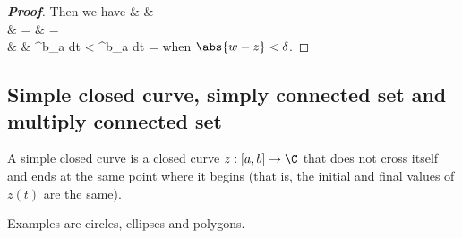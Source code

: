 \begin{proof}[\bf Proof]
Then we have
\beast
& &  \\
& = &  =  \\
& \leq & \int^b_a  dt <   \int^b_a dt = \ve
\eeast
when $\abs{w-z} < \delta$.
\end{proof}




\subsection{Simple closed curve, simply connected set and multiply connected set}


\begin{definition}
A simple closed curve is a closed curve $z:[a,b]\to \C$ that does not cross itself and ends at the same point where it begins (that is, the initial and final values of $z(t)$ are the same).
\end{definition}

\begin{remark}
Examples are circles, ellipses and polygons.
\end{remark}




